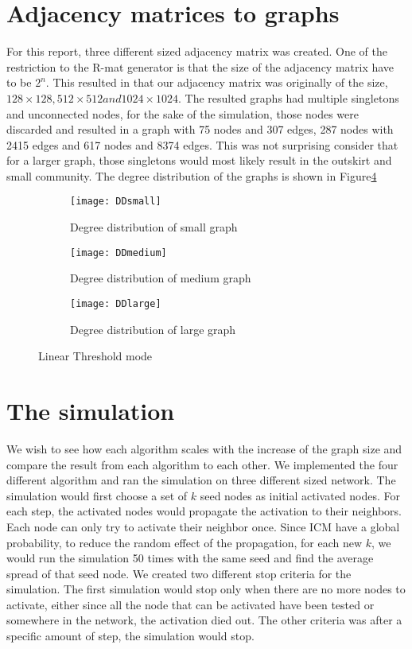 \section{Adjacency matrices to graphs}
For this report, three different sized adjacency matrix was created. One of the restriction to the R-mat generator is that the size of the adjacency matrix have to be $2^n$. This resulted in that our adjacency matrix was originally of the size, $128 \times 128, 512 \times 512 and 1024 \times 1024$. The resulted graphs had multiple singletons and unconnected nodes, for the sake of the simulation, those nodes were discarded and resulted in a graph with 75 nodes and 307 edges, 287 nodes with 2415 edges and 617 nodes and 8374 edges. This was not surprising consider that for a larger graph, those singletons would most likely result in the outskirt and small community. The degree distribution of the graphs is shown in Figure\ref{fig:DD}

\begin{figure}[!ht]
	\begin{subfigure}{0.3\textwidth}
		\texttt{[image: DDsmall]}
		\caption{Degree distribution of small graph} 
		\label{fig:linearThresh}
	\end{subfigure}
	\begin{subfigure}{0.3\textwidth}
		\texttt{[image: DDmedium]}
		\caption{Degree distribution of medium graph} 
		\label{fig:linearThresh2}
	\end{subfigure}
	\begin{subfigure}{0.3\textwidth}
		\texttt{[image: DDlarge]}
		\caption{Degree distribution of large graph} 
		\label{fig:linearThresh3}
	\end{subfigure}
	\caption{Linear Threshold mode}
	\label{fig:DD}
\end{figure}



\section{The simulation}
We wish to see how each algorithm scales with the increase of the graph size and compare the result from each algorithm to each other. We implemented the four different algorithm and ran the simulation on three different sized network. The simulation would first choose a set of $k$ seed nodes as initial activated nodes. For each step, the activated nodes would propagate the activation to their neighbors. Each node can only try to activate their neighbor once. Since ICM have a global probability, to reduce the random effect of the propagation, for each new $k$, we would run the simulation 50 times with the same seed and find the average spread of that seed node. We created two different stop criteria for the simulation. The first simulation would stop only when there are no more nodes to activate, either since all the node that can be activated have been tested or somewhere in the network, the activation died out. The other criteria was after a specific amount of step, the simulation would stop.

